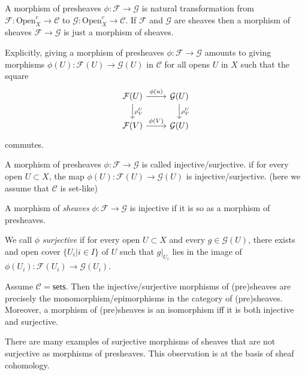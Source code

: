 A morphism of presheaves $\phi: \mathcal{F}  \to \mathcal{G} $ is natural transformation from $\mathcal{F} : \text{Open}_X^{c} \to \mathcal{C} $ to $\mathcal{G}: \text{Open}_X^{c} \to \mathcal{C}$.
If $\mathcal{F} $ and $\mathcal{G} $ are sheaves then a morphism of sheaves $\mathcal{F}  \to \mathcal{G} $ is just a morphism of sheaves.

Explicitly, giving a morphism of presheaves $\phi: \mathcal{F}  \to \mathcal{G} $ amounts to giving morphisms $\phi(U): \mathcal{F} \left( U \right) \to \mathcal{G} (U)$ in $\mathcal{C}  $ for all opens $U $ in $X$ such that the square \[
\begin{tikzcd}
	\mathcal{F} (U) \arrow[r, "\phi(u)"] \arrow[d,"\rho^U_V"] & \mathcal{G} (U) \arrow[d, "\rho_V^U"] \\
	\mathcal{F} (V) \arrow[r, "\phi(V)"] & \mathcal{G} (U)
\end{tikzcd}
\] commutes. 
\begin{definition}
	A morphism of presheaves $\phi:\mathcal{F}  \to \mathcal{G} $ is called injective/surjective. if for every open  $U \subset X$, the map $\phi(U):\mathcal{F} (U) \to \mathcal{G} (U)$ is injective/surjective.
	(here we assume that $\mathcal{C} $ is set-like)

	A morphism of \emph{sheaves} $\phi:\mathcal{F}  \to \mathcal{G} $ is injective if it is so as a morphism of presheaves.

	We call $\phi$ \emph{surjective} if for every open $U \subset X$ and every $g \in \mathcal{G} (U)$, there exists and open cover $\{U_i | i \in I\} $ of $U$ such that $g|_{U_i}$ lies in the image of $\phi(U_i): \mathcal{F} (U_i) \to \mathcal{G} (U_i)$.
\end{definition}

\begin{motivation}
	Assume $\mathcal{C} = \mathsf{sets}$. Then the injective/surjective morphisms of (pre)sheaves are precisely the monomorphism/epimorphisms in the category of (pre)sheaves.
	Moreover, a morphism of (pre)sheaves is an isomorphism iff it is both injective and surjective.
\end{motivation}

There are many examples of surjective morphisms of sheaves that are not surjective as morphisms of presheaves. This observation is at the basis of sheaf cohomology.

